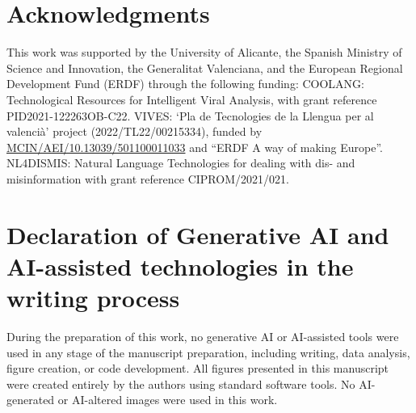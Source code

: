 \documentclass[preprint, times, review, 10pt]{elsarticle}
\begin{document}
\section*{Acknowledgments}
This work was supported by the University of Alicante, the Spanish Ministry of Science and Innovation, the Generalitat Valenciana, and the European Regional Development Fund (ERDF) through the following funding: COOLANG: Technological Resources for Intelligent Viral Analysis, with grant reference PID2021-122263OB-C22. VIVES: ‘Pla de Tecnologies de la Llengua per al valencià’ project (2022/TL22/00215334), funded by \url{MCIN/AEI/10.13039/501100011033} and “ERDF A way of making Europe”. NL4DISMIS: Natural Language Technologies for dealing with dis- and misinformation with grant reference CIPROM/2021/021.


\section*{Declaration of Generative AI and AI-assisted technologies in the writing process}

During the preparation of this work, no generative AI or AI-assisted tools were used in any stage of the manuscript preparation, including writing, data analysis, figure creation, or code development. All figures presented in this manuscript were created entirely by the authors using standard software tools. No AI-generated or AI-altered images were used in this work.





\setlength{\bibsep}{2pt plus 0.5pt minus 0.5pt}



\end{document}

